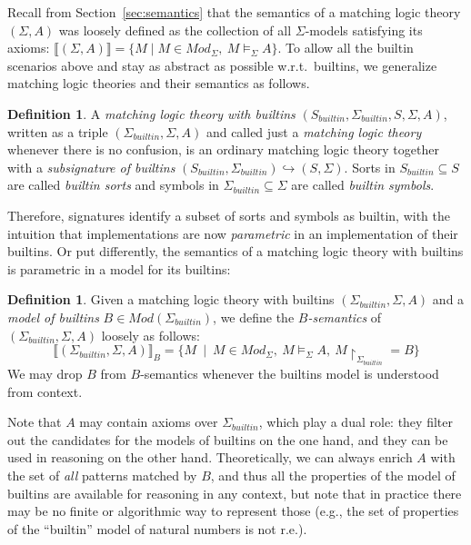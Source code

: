 \documentclass[UTF8,11pt]{article}
\newcounter{thmcounter}
\theoremstyle{plain}
\theoremstyle{definition}
\newtheorem{definition} [thmcounter]{Definition}
\theoremstyle{remark}
\newcommand{\Mod}{\textit{Mod}}
\newcommand{\denote}[1]{\llbracket{#1}\rrbracket}
\newcommand{\reduct}[2]{\mbox{${#1}\!\!\upharpoonright_{#2}$}}
\newcommand{\builtin}{\textit{builtin}}
\begin{document}
Recall from Section~\ref{sec:semantics} that the semantics of a matching
logic theory $(\Sigma,A)$ was loosely defined as the collection of all
$\Sigma$-models satisfying its axioms: $\denote{(\Sigma,A)} =
\{M \mid M \in \Mod_{\Sigma},\ M \models_{\Sigma} A \}$.
To allow all the builtin scenarios above and stay as abstract as possible
w.r.t.~builtins, we generalize matching logic theories and their semantics
as follows.

\begin{definition}
A \emph{matching logic theory with builtins}
$(S_\builtin,\Sigma_\builtin,S,\Sigma,A)$, written as a triple
$(\Sigma_\builtin,\Sigma,A)$ and
called just a \emph{matching logic theory} whenever there is no confusion,
is an ordinary matching logic theory together with a
\emph{subsignature of builtins}
$(S_\builtin,\Sigma_\builtin)\hookrightarrow(S,\Sigma)$.
Sorts in $S_\builtin \subseteq S$ are called \emph{builtin sorts} and symbols in
$\Sigma_\builtin \subseteq \Sigma$ are called \emph{builtin symbols}.
\end{definition}

Therefore, signatures identify a subset of sorts and symbols as builtin,
with the intuition that implementations are now \emph{parametric} in an
implementation of their builtins.
Or put differently, the semantics of a matching logic theory with builtins
is parametric in a model for its builtins:

\begin{definition}
Given a matching logic theory with builtins $(\Sigma_\builtin,\Sigma,A)$ and
a \emph{model of builtins} $B \in \Mod(\Sigma_\builtin)$, we define
the \emph{$B$-semantics} of $(\Sigma_\builtin,\Sigma,A)$ loosely as follows:
$$
\denote{(\Sigma_\builtin,\Sigma,A)}_B =
\{M \ \mid \ M \in \Mod_{\Sigma},\ M \models_{\Sigma} A,\ \reduct{M}{\Sigma_\builtin} = B \}
$$
We may drop $B$ from $B$-semantics whenever the builtins model is
understood from context.
\end{definition}

Note that $A$ may contain axioms over $\Sigma_\builtin$, which play a dual
role: they filter out the candidates for the models of builtins on the one
hand, and they can be used in reasoning on the other hand.
Theoretically, we can always enrich $A$ with the set of \emph{all} patterns
matched by $B$, and thus all the properties of the model of builtins are
available for reasoning in any context, but note that in practice there may
be no finite or algorithmic way to represent those
(e.g., the set of properties of the ``builtin'' model of natural numbers is
not r.e.).
\end{document}
